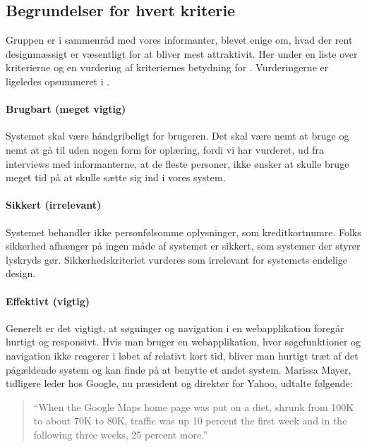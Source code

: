 \subsection{Begrundelser for hvert kriterie}
\label{sec:begrundelsekriterier}



Gruppen er i sammenråd med vores informanter, blevet enige om, hvad der rent designmæssigt er væsentligt for at \Foodl{} bliver mest attraktivit. Her under en liste over kriterierne og en vurdering af kriteriernes betydning for \Foodl{}. Vurderingerne er ligeledes opsummeret i .

\paragraph{Brugbart (meget vigtig)} 
Systemet skal være håndgribeligt for brugeren. Det skal være nemt at bruge og nemt at gå til uden nogen form for oplæring, fordi vi har vurderet, ud fra interviews med informanterne, at de fleste personer, ikke ønsker at skulle bruge meget tid på at skulle sætte sig ind i vores system. 

\paragraph{Sikkert (irrelevant)} 
Systemet behandler ikke personfølsomme oplysninger, som \fx kreditkortnumre. Folks sikkerhed afhænger på ingen måde af systemet er sikkert, som \fx systemer der styrer lyskryds gør. Sikkerhedskriteriet vurderes som irrelevant for systemets endelige design.

\paragraph{Effektivt (vigtig)} 
Generelt er det vigtigt, at søgninger og navigation i en webapplikation foregår hurtigt og responsivt. Hvis man bruger en webapplikation, hvor søgefunktioner og navigation ikke reagerer i løbet af relativt kort tid, bliver man hurtigt træt af det pågældende system og kan finde på at benytte et andet system. Marissa Mayer, tidligere leder hos Google, nu præsident og direktør for Yahoo, udtalte følgende: \cite{googlespeed}

\begin{quote}
``When the Google Maps home page was put on a diet, shrunk from 100K to about 70K to 80K, traffic was up 10 percent the first week and in the following three weeks, 25 percent more.''
\end{quote}  

